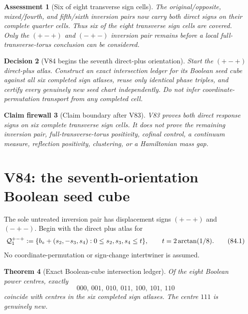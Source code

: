 \documentclass[11pt,oneside]{article}
\newtheorem{theorem}{Theorem}[section]
\newtheorem{assessment}[theorem]{Assessment}
\newtheorem{firewall}[theorem]{Claim firewall}
\newtheorem{decision}[theorem]{Decision}
\theoremstyle{definition}
\theoremstyle{remark}
\begin{document}
\begin{assessment}[Six of eight transverse sign cells]
\label{ass:newv83}
The original/opposite, mixed/fourth, and fifth/sixth inversion pairs
now carry both direct signs on their complete quarter cells.  Thus
six of the eight transverse sign cells are covered.  Only the
\((+-+)\) and \((-+-)\) inversion pair remains before a local
full-transverse-torus conclusion can be considered.
\end{assessment}

\begin{decision}[V84 begins the seventh direct-plus orientation]
\label{dec:newv83-next}
Start the \((+-+)\) direct-plus atlas.  Construct an exact
intersection ledger for its Boolean seed cube against all six
completed sign atlases, reuse only identical phase triples, and
certify every genuinely new seed chart independently.  Do not infer
coordinate-permutation transport from any completed cell.
\end{decision}

\begin{firewall}[Claim boundary after V83]
\label{fire:newv83-final}
V83 proves both direct response signs on six complete transverse
sign cells.  It does not prove the remaining inversion pair,
full-transverse-torus positivity, cofinal control, a continuum
measure, reflection positivity, clustering, or a Hamiltonian mass
gap.
\end{firewall}

\section{V84: the seventh-orientation Boolean seed cube}
\label{sec:newv84-seventh-seed}

The sole untreated inversion pair has displacement signs
\((+-+)\) and \((-+-)\).  Begin with the direct plus atlas for
\[
 {\cal Q}^{+-+}_1:=
 \{b_\circ+(s_2,-s_3,s_4):0\leq s_2,s_3,s_4\leq t\},
 \qquad t=2\arctan(1/8).                               \tag{84.1}
\]
No coordinate-permutation or sign-change intertwiner is assumed.

\begin{theorem}[Exact Boolean-cube intersection ledger]
\label{thm:newv84-intersection}
Of the eight Boolean power centres, exactly
\[
 000,\ 001,\ 010,\ 011,\ 100,\ 101,\ 110              \tag{84.2}
\]
coincide with centres in the six completed sign atlases.  The centre
\(111\) is genuinely new.
\end{theorem}
\end{document}
